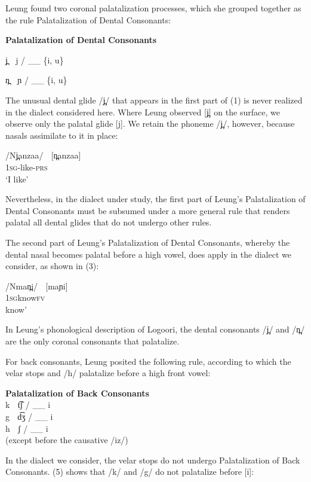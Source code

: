 \documentclass[output=paper]{langsci/langscibook}
\begin{document}
Leung found two coronal palatalization processes, which she grouped together as the rule Palatalization of Dental Consonants:


\ea{}

\textbf{Palatalization of Dental Consonants} \citep[117]{Leung1991}




j̪  j / \_\_ \{i, u\}

n̪  ɲ / \_\_ \{i, u\}
\z


The unusual dental glide /j̪/ that appears in the first part of (1) is never realized in the dialect considered here. Where Leung observed [j̪] on the surface, we observe only the palatal glide [j]. We retain the phoneme /j̪/, however, because nasals assimilate to it in place:

\ea{}
 /Nj̪anzaa/    [n̪anzaa]  \\{}
\textsc{1sg}{}-like-\textsc{prs}\\{}
\glt ‘I like’
\z

Nevertheless, in the dialect under study, the first part of Leung’s Palatalization of Dental Consonants must be subsumed under a more general rule that renders palatal all dental glides that do not undergo other rules.

The second part of Leung’s Palatalization of Dental Consonants, whereby the dental nasal becomes palatal before a high vowel, does apply in the dialect we consider, as shown in (3):


\ea{}
 /Nman̪i/    [maɲi]   \\{} 
\textsc{1sg}know\textsc{fv}\\{}
 know’
\z

In Leung’s phonological description of Logoori, the dental consonants /j̪/ and /n̪/ are the only coronal consonants that palatalize.    

For back consonants, Leung posited the following rule, according to which the velar stops and /h/ palatalize before a high front vowel:


\ea{}
\textbf{Palatalization of Back Consonants} \citep[116]{Leung1991}\\{}
k  t͡ʃ / \_\_ i
\\{}
g  d͡ʒ / \_\_ i
\\{}
h  ʃ / \_\_ i      
\\{}
(except before the causative /iz/)
\z


In the dialect we consider, the velar stops do not undergo Palatalization of Back Consonants. (5) shows that /k/ and /g/ do not palatalize before [i]:
\end{document}
